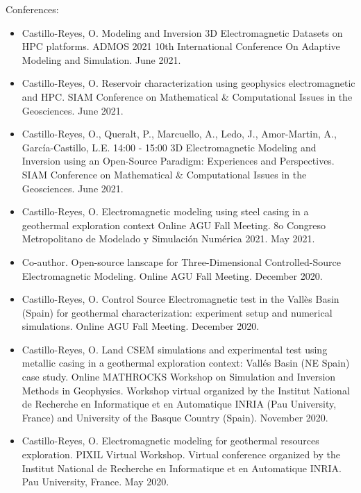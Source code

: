 \documentclass[letterpaper,10pt,english]{sphinxmanual}
\begin{document}
Conferences:
\begin{itemize}
\item {} 
Castillo-Reyes, O. Modeling and Inversion 3D Electromagnetic Datasets on HPC platforms. ADMOS 2021 10th International Conference On Adaptive Modeling and Simulation. June 2021.

\item {} 
Castillo-Reyes, O. Reservoir characterization using geophysics electromagnetic and HPC. SIAM Conference on Mathematical \& Computational Issues in the Geosciences. June 2021.

\item {} 
Castillo-Reyes, O., Queralt, P., Marcuello, A., Ledo, J., Amor-Martin, A., García-Castillo, L.E. 14:00 - 15:00 3D Electromagnetic Modeling and Inversion using an Open-Source Paradigm: Experiences and Perspectives. SIAM Conference on Mathematical \& Computational Issues in the Geosciences. June 2021.

\item {} 
Castillo-Reyes, O. Electromagnetic modeling using steel casing in a geothermal exploration context Online AGU Fall Meeting. 8o Congreso Metropolitano de Modelado y Simulación Numérica 2021. May 2021.

\item {} 
Co-author.  Open-source lanscape for Three-Dimensional Controlled-Source Electromagnetic Modeling. Online AGU Fall Meeting. December 2020.

\item {} 
Castillo-Reyes, O. Control Source Electromagnetic test in the Vallès Basin (Spain) for geothermal characterization: experiment setup and numerical simulations. Online AGU Fall Meeting. December 2020.

\item {} 
Castillo-Reyes, O. Land CSEM simulations and experimental test using metallic casing in a geothermal exploration context: Vallés Basin (NE Spain) case study. Online MATHROCKS Workshop on Simulation and Inversion Methods in Geophysics. Workshop virtual organized by the Institut National de Recherche en Informatique et en Automatique \textendash{} INRIA (Pau University, France) and University of the Basque Country (Spain). November 2020.

\item {} 
Castillo-Reyes, O. Electromagnetic modeling for geothermal resources exploration. PIXIL Virtual Workshop. Virtual conference organized by the Institut National de Recherche en Informatique et en Automatique \textendash{} INRIA. Pau University, France. May 2020.


\end{itemize}
\end{document}

